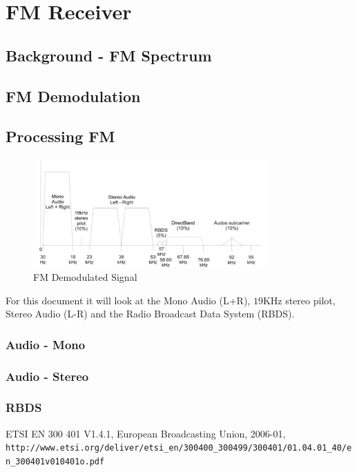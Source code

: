 \documentclass[12pt]{article}
\begin{document}
\newpage
\section{FM Receiver}
\subsection{Background - FM Spectrum}

\subsection{FM Demodulation}


\subsection{Processing FM}

\begin{figure}[H]
	\centering
	\includegraphics[width=0.8\textwidth]{FM_demodulated.png}
	\caption{FM Demodulated Signal}
	\label{fig:fm:demod-sig}
\end{figure}
For this document it will look at the Mono Audio (L+R), $19$KHz stereo pilot, Stereo Audio (L-R) and the Radio Broadcast Data System (RBDS).

\subsubsection{Audio - Mono}

\subsubsection{Audio - Stereo} 

\subsubsection{RBDS}











\newpage
\begin{thebibliography}{9} 
ETSI EN 300 401 V1.4.1, European Broadcasting Union, 2006-01, 
\\\texttt{http://www.etsi.org/deliver/etsi\_en/300400\_300499/300401/01.04.01\_40/en\_300401v010401o.pdf}



\end{thebibliography}
\end{document}
